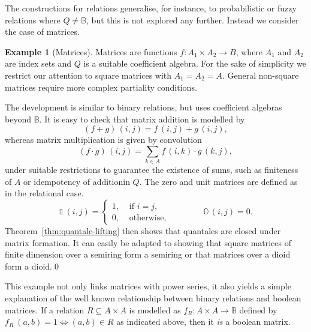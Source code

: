 \documentclass[12pt]{article}
\theoremstyle{definition}
\newtheorem{example}{Example}
\newcommand{\refthm}[1]{Theorem~\ref{#1}}
\newcommand{\unit}{\mathbb{1}}
\newcommand{\zero}{\mathbb{O}}
\begin{document}
The constructions for relations generalise, for instance, to
probabilistic or fuzzy relations where $Q\neq\mathbb{B}$, but this is
not explored any further. Instead we consider the case of matrices.

\begin{example}[Matrices]\label{ex:matrices}
  Matrices are functions $f:A_1\times A_2\to B$, where $A_1$ and $A_2$
  are index sets and $Q$ is a suitable coefficient algebra. For the
  sake of simplicity we restrict our attention to square matrices with
  $A_1=A_2= A$. General non-square matrices require more complex
  partiality conditions.

  The development is similar to binary relations, but uses coefficient
  algebras beyond $\mathbb{B}$. It is easy to check that matrix
  addition is modelled by
\begin{equation*}
(f+g)\, (i,j)= f\, (i,j)+g\, (i,j),
\end{equation*}
whereas matrix multiplication is given by
convolution
\begin{equation*}
  (f\cdot g)\, (i,j)=\sum_{k\in A}f\, (i,k)\cdot g\, (k,j),
\end{equation*}
under suitable restrictions to guarantee the existence of sums, such
as finiteness of $A$ or idempotency of additionin $Q$. The zero and
unit matrices are defined as in the relational case.
\begin{equation*}
  \unit\, (i,j) =
  \begin{cases}
    1,& \text{ if } i=j,\\
    0, & \text{ otherwise},
  \end{cases}
\qquad\qquad
\zero\, (i,j) = 0.
\end{equation*}
\refthm{thm:quantale-lifting} then shows that quantales are closed
under matrix formation. It can easily be adapted to showing that square
matrices of finite dimension over a semiring form a semiring or that
matrices over a dioid form a dioid.\qed
\end{example}

This example not only links matrices with  power series, it also
yields a simple explanation of the well known relationship between
binary relations and boolean matrices. If a relation $R\subseteq
A\times A$ is modelled as $f_R:A\times A\to \mathbb{B}$ defined by
$f_R\ (a,b)=1 \Leftrightarrow (a,b)\in R$ as indicated above, then it
\emph{is} a boolean matrix.
\end{document}
